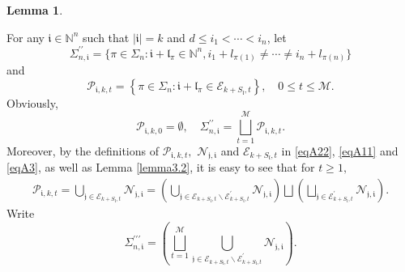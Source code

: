 \documentclass[11pt]{article}
\theoremstyle{plain}
\newtheorem{lem}[thm]{Lemma}
\theoremstyle{definition}
\begin{document}
{\begin{lem}
\end{lem}
For any $\mathfrak{i} \in \mathbb{N}^n$
	such that $|\mathfrak{i}|= k$ and $d\leq i_1 < \cdots < i_n$, let
	\begin{equation}\label{eqA2233}
		\Sigma_{n,\mathfrak{i}}^{\prime\prime}=\{\pi\in\Sigma_{n}: \mathfrak{i}+\mathfrak{l}_\pi \in \mathbb{N}^n, i_1+l_{\pi(1)} \neq \cdots \neq i_n+l_{\pi(n)} \}
	\end{equation}
	and \begin{equation}\label{eqA22}
		\mathcal{P}_{\mathfrak{i},k,t  }=\left \{ \pi\in\Sigma_{n}: \mathfrak{i}+\mathfrak{l}_\pi \in \mathcal{E}_{k+S_{\mathfrak{l}},t } \right \}, \quad 0 \leq t \leq \mathscr{M}.
	\end{equation}
	Obviously, 
	\begin{equation}\label{eqA2211} \mathcal{P}_{\mathfrak{i},k,0 }=\emptyset, \quad \Sigma_{n,\mathfrak{i}}^{\prime \prime}= \mathop{\bigsqcup}_{t=1}^{\mathscr{M}}\mathcal{P}_{\mathfrak{i},k,t}.\end{equation}
	Moreover, by the definitions of $\mathcal{P}_{\mathfrak{i},k,t  },$ $\mathcal{N}_{\mathfrak{j}, \mathfrak{i}  }$ and $\mathcal{E}_{k+S_{\mathfrak{l}},t }$  in \eqref{eqA22}, \eqref{eqA11} and \eqref{eqA3}, as well as Lemma \ref{lemma3.2},
	it is easy to see that for $t\geq 1,$
	\begin{eqnarray}\label{eq3.1}
		\mathcal{P}_{\mathfrak{i},k,t  }= \mathop{\bigcup}\limits_{\mathfrak{j}\in \mathcal{E}_{k+S_{\mathfrak{l}},t}} \mathcal{N}_{\mathfrak{j},\mathfrak{i}}=\left(\mathop{\bigcup}\limits_{\mathfrak{j}\in \mathcal{E}_{k+S_{\mathfrak{l}},t}\backslash
\mathcal{E}_{k+S_{\mathfrak{l}},t}^{\prime}} \mathcal{N}_{\mathfrak{j},\mathfrak{i}}\right)\bigsqcup \left(\bigsqcup\limits_{\mathfrak{j}\in \mathcal{E}_{k+S_{\mathfrak{l}},t}^{\prime}} \mathcal{N}_{\mathfrak{j},\mathfrak{i}}\right) .
	\end{eqnarray}
Write \begin{equation}\label{eqA221221}\Sigma_{n,\mathfrak{i}}^{\prime \prime\prime}=\left(\mathop{\bigsqcup}_{t=1}^{\mathscr{M}}\mathop{\bigcup}\limits_{\mathfrak{j}\in \mathcal{E}_{k+S_{\mathfrak{l}},t}\backslash
\mathcal{E}_{k+S_{\mathfrak{l}},t}^{\prime}} \mathcal{N}_{\mathfrak{j},\mathfrak{i}}\right).\end{equation}

}
\end{document}
